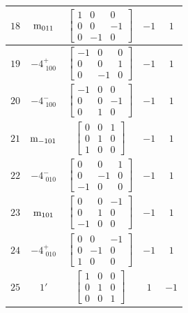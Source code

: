 \documentclass[fleqn,8pt]{jsarticle}
\begin{document}
\begin{longtable}{ccccc}
$ 18 $ & $ {\rm m}_{011} $ & $ \begin{bmatrix} 1 & 0 & 0 \\ 0 & 0 & -1 \\ 0 & -1 & 0 \end{bmatrix} $ & $ -1 $ & $ 1 $ \\ \hline
$ 19 $ & $ -4^{+}_{\,\,100} $ & $ \begin{bmatrix} -1 & 0 & 0 \\ 0 & 0 & 1 \\ 0 & -1 & 0 \end{bmatrix} $ & $ -1 $ & $ 1 $ \\ \hline
$ 20 $ & $ -4^{-}_{\,\,100} $ & $ \begin{bmatrix} -1 & 0 & 0 \\ 0 & 0 & -1 \\ 0 & 1 & 0 \end{bmatrix} $ & $ -1 $ & $ 1 $ \\ \hline
$ 21 $ & $ {\rm m}_{-101} $ & $ \begin{bmatrix} 0 & 0 & 1 \\ 0 & 1 & 0 \\ 1 & 0 & 0 \end{bmatrix} $ & $ -1 $ & $ 1 $ \\ \hline
$ 22 $ & $ -4^{-}_{\,\,010} $ & $ \begin{bmatrix} 0 & 0 & 1 \\ 0 & -1 & 0 \\ -1 & 0 & 0 \end{bmatrix} $ & $ -1 $ & $ 1 $ \\ \hline
$ 23 $ & $ {\rm m}_{101} $ & $ \begin{bmatrix} 0 & 0 & -1 \\ 0 & 1 & 0 \\ -1 & 0 & 0 \end{bmatrix} $ & $ -1 $ & $ 1 $ \\ \hline
$ 24 $ & $ -4^{+}_{\,\,010} $ & $ \begin{bmatrix} 0 & 0 & -1 \\ 0 & -1 & 0 \\ 1 & 0 & 0 \end{bmatrix} $ & $ -1 $ & $ 1 $ \\ \hline
$ 25 $ & $ 1{}' $ & $ \begin{bmatrix} 1 & 0 & 0 \\ 0 & 1 & 0 \\ 0 & 0 & 1 \end{bmatrix} $ & $ 1 $ & $ -1 $ \\ \hline

\end{longtable}
\end{document}
